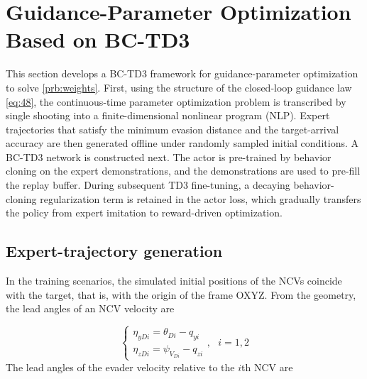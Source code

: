 \section{Guidance-Parameter Optimization Based on BC-TD3}
This section develops a BC-TD3 framework for guidance-parameter optimization to solve \cref{prb:weights}. First, using the structure of the closed-loop guidance law \eqref{eq:48}, the continuous-time parameter optimization problem is transcribed by single shooting into a finite-dimensional nonlinear program (NLP). Expert trajectories that satisfy the minimum evasion distance and the target-arrival accuracy are then generated offline under randomly sampled initial conditions. A BC-TD3 network is constructed next. The actor is pre-trained by behavior cloning on the expert demonstrations, and the demonstrations are used to pre-fill the replay buffer. During subsequent TD3 fine-tuning, a decaying behavior-cloning regularization term is retained in the actor loss, which gradually transfers the policy from expert imitation to reward-driven optimization.

\subsection{Expert-trajectory generation}
In the training scenarios, the simulated initial positions of the NCVs coincide with the target, that is, with the origin of the frame OXYZ. From the geometry, the lead angles of an NCV velocity are

\begin{equation}
\label{eq:67}
\left\{ {\begin{array}{*{20}{l}}
  {{\eta _{yDi}} = {\theta _{Di}} - {q_{yi}}} \\ 
  {{\eta _{zDi}} = {\psi _{{V_{Di}}}} - {q_{zi}}} 
\end{array},{\text{ }}i = 1,2} \right.
\end{equation}
The lead angles of the evader velocity relative to the $i$th NCV are

